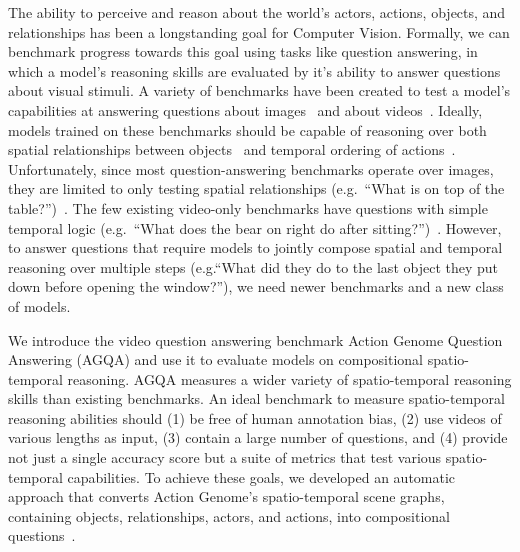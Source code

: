 \documentclass[10pt,twocolumn,letterpaper]{article}
\newcommand{\rak}[1]{{\color{red}{rak: #1}}}
\newcommand{\mgm}[1]{{\color{cyan}{mgm: #1}}}
\begin{document}
The ability to perceive and reason about the world's actors, actions, objects, and relationships has been a longstanding goal for Computer Vision. Formally, we can benchmark progress towards this goal using tasks like question answering, in which a model's reasoning skills are evaluated by it's ability to answer questions about visual stimuli. A variety of benchmarks have been created to test a model's capabilities at answering questions about images~\cite{johnson2017clevr,hudson2019gqa,antol2015vqa,zellers2019recognition,goyal2017making,krishna2017visual,zhu2016visual7w,kim2020answering} and about videos~\cite{tapaswi2016movieqa,lei2018tvqa,jang2017tgif,kim2017deepstory,xu2017video,maharaj2017dataset,zeng2016leveraging,yu2019activitynet}. Ideally, models trained on these benchmarks should be capable of reasoning over both spatial relationships between objects~\cite{krishna2017visual,lu2016visual} and temporal ordering of actions~\cite{zacks2001events,ji2020action}. Unfortunately, since most question-answering benchmarks operate over images, they are limited to only testing spatial relationships (e.g.~``What is on top of the table?'')~\cite{hudson2019gqa,krishna2017visual,antol2015vqa}. The few existing video-only benchmarks have questions with simple temporal logic (e.g.~``What does the bear on right do after sitting?'')~\cite{jang2017tgif,xu2017video,maharaj2017dataset,zeng2016leveraging,yu2019activitynet}. However, to answer questions that require models to jointly compose spatial and temporal reasoning over multiple steps (e.g.``What did they do to the last object they put down before opening the window?''), we need newer benchmarks and a new class of models.


We introduce the video question answering benchmark Action Genome Question Answering (AGQA) and use it to evaluate models on compositional spatio-temporal reasoning. AGQA measures a wider variety of spatio-temporal reasoning skills than existing benchmarks. An ideal benchmark to measure spatio-temporal reasoning abilities should (1) be free of human annotation bias, (2) use videos of various lengths as input, (3) contain a large number of questions, and (4) provide not just a single accuracy score but a suite of metrics that test various spatio-temporal capabilities. To achieve these goals, we developed an automatic approach that converts Action Genome’s spatio-temporal scene graphs, containing objects, relationships, actors, and actions, into compositional questions~\cite{ji2020action}.
\end{document}
